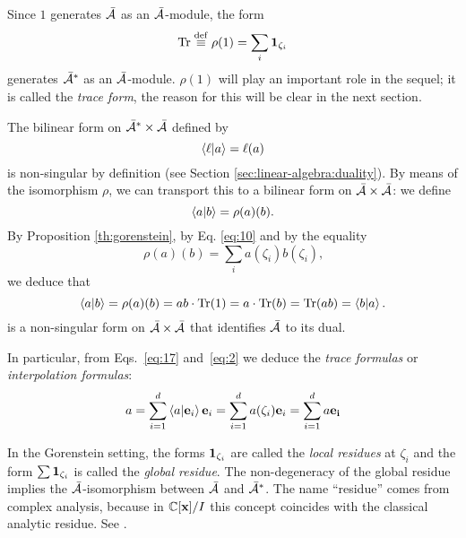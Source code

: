 Since $1$ generates $\bar{\mathcal{A}}$ as an $\bar{\mathcal{A}}$-module, the form
\begin{equation}
  \label{eq:7}
  \operatorname{Tr} \overset{\mathrm{def}}{\equiv} \rho(1) = \sum_i\mathbf{1}_{\zeta_i}
\end{equation}
generates $\bar{\mathcal{A}}^\ast$ as an $\bar{\mathcal{A}}$-module.
$\rho(1)$ will play an important role in the sequel; it is called the
\emph{trace form}, the reason for this will be clear in the next
section.

The bilinear form on $\bar{\mathcal{A}}^\ast\times\bar{\mathcal{A}}$
defined by
\begin{equation}
  \label{eq:11}
  \left\langle \ell \middle| a \right\rangle = \ell(a)
\end{equation}
is non-singular by definition (see Section
\ref{sec:linear-algebra:duality}). By means of the isomorphism $\rho$,
we can transport this to a bilinear form on
$\bar{\mathcal{A}}\times\bar{\mathcal{A}}$: we define
\begin{equation}
  \label{eq:15}
  \left\langle a \middle| b \right\rangle=\rho(a)(b)
  \text{.}
\end{equation}
By Proposition \ref{th:gorenstein}, by Eq. \eqref{eq:10} and by the
equality
\begin{equation}
  \label{eq:16}
  \rho(a)(b) = \sum_i a(\zeta_i)b(\zeta_i)
  \text{,}
\end{equation}
we deduce that
\begin{equation}
  \label{eq:17}
  \left\langle a \middle| b \right\rangle = \rho(a)(b) = ab\cdot\operatorname{Tr}(1) = a\cdot\operatorname{Tr}(b) = \operatorname{Tr}(ab) = \left\langle b \middle| a \right\rangle
  \text{.}
\end{equation}
is a non-singular form on $\bar{\mathcal{A}}\times\bar{\mathcal{A}}$
that identifies $\bar{\mathcal{A}}$ to its dual.

In particular, from Eqs.~\eqref{eq:17} and~\eqref{eq:2} we deduce the
\emph{trace formulas} or \emph{interpolation formulas}:
\begin{equation}
  \label{eq:21}
  a = \sum_{i=1}^d\left\langle a \middle| \mathbf{e}_i \right\rangle\mathbf{e}_i=\sum_{i=1}^da(\zeta_i)\mathbf{e}_i=\sum_{i=1}^da\mathbf{e_i}
\end{equation}

\begin{nota}
  In the Gorenstein setting, the forms $\mathbf{1}_{\zeta_i}$ are
  called the \emph{local residues} at $\zeta_i$ and the form
  $\sum\mathbf{1}_{\zeta_i}$ is called the \emph{global residue}. The
  non-degeneracy of the global residue implies the
  $\bar{\mathcal{A}}$-isomorphism between $\bar{\mathcal{A}}$ and
  $\bar{\mathcal{A}}^\ast$.  The name ``residue'' comes from complex
  analysis, because in $\mathbb{C}[\mathbf{x}]/I$ this concept coincides with the
  classical analytic residue. See
  \cite{bykov+kytmanov+lazman,mourrain+elkadi}.
\end{nota}


